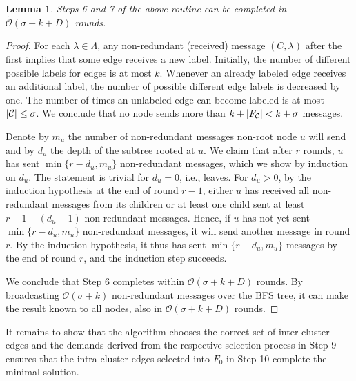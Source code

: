 \documentclass[letterpaper,11pt]{article}
\newtheorem{lemma}[theorem]{Lemma}
\newcommand{\BO}{\mathcal{O}}
\newcommand{\sO}{\tilde{\mathcal{O}}}
\newcommand{\Comp}{\lambda}
\begin{document}
\begin{lemma}\label{lemma:prune_6_7}
Steps 6 and 7 of the above routine can be completed in $\sO(\sigma+k+D)$ rounds.
\end{lemma}
\begin{proof}
For each $\Comp \in \Lambda$, any non-redundant (received) message
$(C,\Comp)$ after the first implies that some edge receives a new label.
Initially, the number of different possible labels for edges is at most $k$.
Whenever an already labeled edge receives an additional label, the number of
possible different edge labels is decreased by one. The number of times an
unlabeled edge can become labeled is at most $|{\cal C}|\leq \sigma$. We
conclude that no node sends more than $k+|F_{\cal C}|< k+\sigma$ messages.

Denote by $m_u$ the number of non-redundant messages non-root node $u$ will send
and by $d_u$ the depth of the subtree rooted at $u$. We claim that after $r$
rounds, $u$ has sent $\min\{r-d_u,m_u\}$ non-redundant messages, which we show
by induction on $d_u$. The statement is trivial for $d_u=0$, i.e., leaves. For
$d_u>0$, by the induction hypothesis at the end of round $r-1$, either $u$ has
received all non-redundant messages from its children or at least one child sent
at least $r-1-(d_u-1)$ non-redundant messages. Hence, if $u$ has not yet sent
$\min\{r-d_u,m_u\}$ non-redundant messages, it will send another message in
round $r$. By the induction hypothesis, it thus has sent $\min\{r-d_u,m_u\}$
messages by the end of round $r$, and the induction step succeeds.

We conclude that Step 6 completes within $\BO(\sigma+k+D)$ rounds. By
broadcasting $\BO(\sigma+k)$ non-redundant messages over the BFS tree, it can
make the result known to all nodes, also in $\BO(\sigma+k+D)$ rounds.
\end{proof}

It remains to show that the algorithm chooses the correct set of inter-cluster
edges and the demands derived from the respective selection process in Step 9
ensures that the intra-cluster edges selected into $F_0$ in Step 10 complete the
minimal solution.
\end{document}
